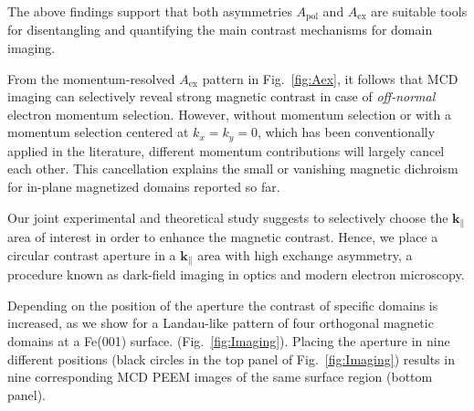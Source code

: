 \documentclass[prl,twocolumn,floatfix,superscriptaddress,aps]{revtex4-2}
\renewcommand{\vec}[1]{\boldsymbol{#1}}
\begin{document}
The above findings support that both asymmetries $A_{\mathrm{pol}}$ and $A_{\mathrm{ex}}$ are suitable tools for disentangling and quantifying the main contrast mechanisms for domain imaging. 

From the momentum-resolved $A_{\mathrm{ex}}$ pattern in Fig.~\ref{fig:Aex}, it follows that MCD imaging can selectively reveal strong magnetic contrast in case of \emph{off-normal} electron momentum selection. However, without momentum selection or with a momentum selection centered at $k_x = k_y = 0$, which has been conventionally applied in the literature, different momentum contributions will largely cancel each other. This cancellation explains the small or vanishing magnetic dichroism for in-plane magnetized domains reported so far.

Our joint experimental and theoretical study suggests to selectively choose the $\vec{k}_{\parallel}$ area of interest in order to enhance the magnetic contrast. Hence, we place a circular contrast aperture in a $\vec{k}_{\parallel}$ area with high exchange asymmetry, a procedure known as dark-field imaging in optics and modern electron microscopy. 

Depending on the position of the aperture the contrast of specific domains is increased, as we show for a Landau-like pattern of four orthogonal magnetic domains at a Fe(001) surface. (Fig.~\ref{fig:Imaging}). Placing the aperture in nine different positions (black circles in the top panel of Fig.~\ref{fig:Imaging})  results in nine corresponding MCD PEEM images of the same surface region (bottom panel). 
\end{document}
